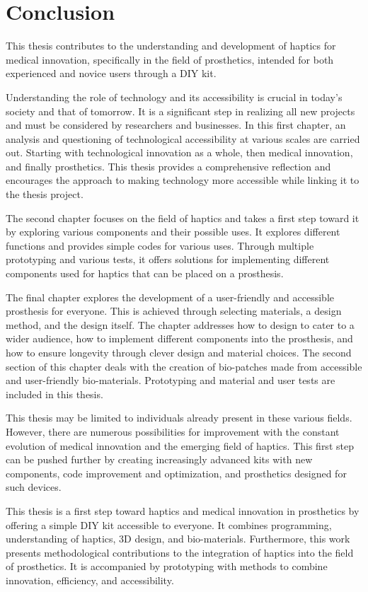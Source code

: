 \chapter{Conclusion}

This thesis contributes to the understanding and development of haptics for medical innovation, specifically in the field of prosthetics, intended for both experienced and novice users through a DIY kit.

Understanding the role of technology and its accessibility is crucial in today's society and that of tomorrow. It is a significant step in realizing all new projects and must be considered by researchers and businesses. In this first chapter, an analysis and questioning of technological accessibility at various scales are carried out. Starting with technological innovation as a whole, then medical innovation, and finally prosthetics. This thesis provides a comprehensive reflection and encourages the approach to making technology more accessible while linking it to the thesis project.

The second chapter focuses on the field of haptics and takes a first step toward it by exploring various components and their possible uses. It explores different functions and provides simple codes for various uses. Through multiple prototyping and various tests, it offers solutions for implementing different components used for haptics that can be placed on a prosthesis.

The final chapter explores the development of a user-friendly and accessible prosthesis for everyone. This is achieved through selecting materials, a design method, and the design itself. The chapter addresses how to design to cater to a wider audience, how to implement different components into the prosthesis, and how to ensure longevity through clever design and material choices. The second section of this chapter deals with the creation of bio-patches made from accessible and user-friendly bio-materials. Prototyping and material and user tests are included in this thesis.

This thesis may be limited to individuals already present in these various fields. However, there are numerous possibilities for improvement with the constant evolution of medical innovation and the emerging field of haptics. This first step can be pushed further by creating increasingly advanced kits with new components, code improvement and optimization, and prosthetics designed for such devices.

This thesis is a first step toward haptics and medical innovation in prosthetics by offering a simple DIY kit accessible to everyone. It combines programming, understanding of haptics, 3D design, and bio-materials. Furthermore, this work presents methodological contributions to the integration of haptics into the field of prosthetics. It is accompanied by prototyping with methods to combine innovation, efficiency, and accessibility.